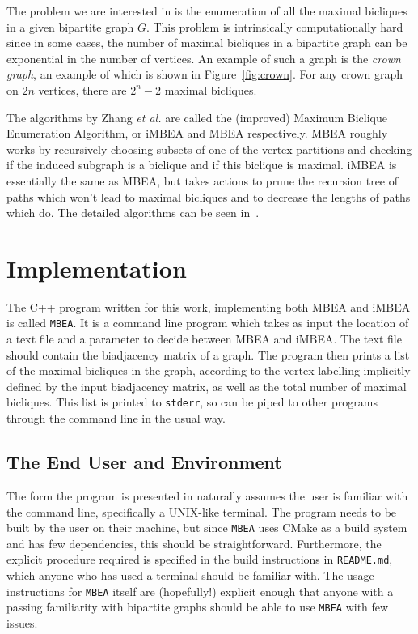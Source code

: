 The problem we are interested in is the enumeration of all the maximal bicliques in a given bipartite graph $G$.
This problem is intrinsically computationally hard since in some cases, the number of maximal bicliques in a bipartite graph can be exponential in the number of vertices.
An example of such a graph is the \emph{crown graph}, an example of which is shown in Figure~\ref{fig:crown}.
For any crown graph on $2n$ vertices, there are $2^n - 2$ maximal bicliques.

The algorithms by Zhang \emph{et al.} are called the (improved) Maximum Biclique Enumeration Algorithm, or iMBEA and MBEA respectively.
MBEA roughly works by recursively choosing subsets of one of the vertex partitions and checking if the induced subgraph is a biclique and if this biclique is maximal.
iMBEA is essentially the same as MBEA, but takes actions to prune the recursion tree of paths which won't lead to maximal bicliques and to decrease the lengths of paths which do.
The detailed algorithms can be seen in~\cite[Algorithm: MBEA]{Zhang2014}.

\section{Implementation}

The C++ program written for this work, implementing both MBEA and iMBEA is called \texttt{MBEA}.
It is a command line program which takes as input the location of a text file and a parameter to decide between MBEA and iMBEA.
The text file should contain the biadjacency matrix of a graph.
The program then prints a list of the maximal bicliques in the graph, according to the vertex labelling implicitly defined by the input biadjacency matrix, as well as the total number of maximal bicliques.   
This list is printed to \texttt{stderr}, so can be piped to other programs through the command line in the usual way.

\subsection{The End User and Environment}

The form the program is presented in naturally assumes the user is familiar with the command line, specifically a UNIX-like terminal.
The program needs to be built by the user on their machine, but since \texttt{MBEA} uses CMake as a build system and has few dependencies, this should be straightforward.
Furthermore, the explicit procedure required is specified in the build instructions in \texttt{README.md}, which anyone who has used a terminal should be familiar with.
The usage instructions for \texttt{MBEA} itself are (hopefully!) explicit enough that anyone with a passing familiarity with bipartite graphs should be able to use \texttt{MBEA} with few issues.

